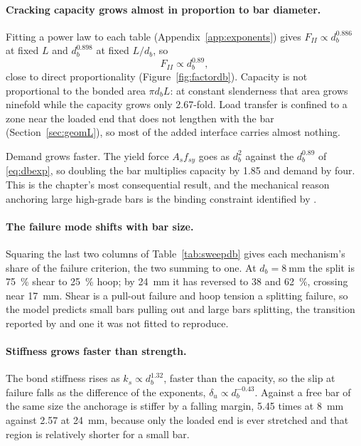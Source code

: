 \paragraph{Cracking capacity grows almost in proportion to bar diameter.}
Fitting a power law to each table (Appendix~\ref{app:exponents}) gives
$F_{II} \propto d_b^{0.886}$ at fixed $L$ and $d_b^{0.898}$ at fixed
$L/d_b$, so
\begin{equation}
\label{eq:dbexp}
F_{II} \propto d_b^{0.89} ,
\end{equation}
close to direct proportionality (Figure~\ref{fig:factordb}). Capacity is
not proportional to the bonded area $\pi d_b L$: at constant slenderness
that area grows ninefold while the capacity grows only \num{2.67}-fold.
Load transfer is confined to a zone near the loaded end that does not
lengthen with the bar (Section~\ref{sec:geomL}), so most of the added
interface carries almost nothing.

Demand grows faster. The yield force $A_s f_{sy}$ goes as $d_b^{2}$
against the $d_b^{0.89}$ of \eqref{eq:dbexp}, so doubling the bar
multiplies capacity by \num{1.85} and demand by four. This is the
chapter's most consequential result, and the mechanical reason anchoring
large high-grade bars is the binding constraint identified by
\textcite{ngChangesAustralianStandards}.

\paragraph{The failure mode shifts with bar size.}
Squaring the last two columns of Table~\ref{tab:sweepdb} gives each
mechanism's share of the failure criterion, the two summing to one. At
$d_b = \SI{8}{\milli\metre}$ the split is \SI{75}{\percent} shear to
\SI{25}{\percent} hoop; by \SI{24}{\milli\metre} it has reversed to
\SI{38}{} and \SI{62}{\percent}, crossing near \SI{17}{\milli\metre}. Shear
is a pull-out failure and hoop tension a splitting failure, so the model
predicts small bars pulling out and large bars splitting, the transition
reported by \textcite{liTensileBondAnchorage2012} and one it was not
fitted to reproduce.

\paragraph{Stiffness grows faster than strength.}
The bond stiffness rises as $k_s \propto d_b^{1.32}$, faster than the
capacity, so the slip at failure falls as the difference of the exponents,
$\delta_u \propto d_b^{-0.43}$. Against a free bar of the same size the
anchorage is stiffer by a falling margin, \num{5.45} times at
\SI{8}{\milli\metre} against \num{2.57} at \SI{24}{\milli\metre}, because
only the loaded end is ever stretched and that region is relatively
shorter for a small bar.


